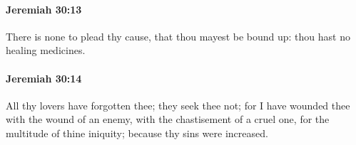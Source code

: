 		\paragraph{Jeremiah 30:13} %
			\label{JEREMIAH-30-13}

			There is none to plead thy cause, that thou mayest be bound up: thou hast no healing medicines.


		\paragraph{Jeremiah 30:14} %
			\label{JEREMIAH-30-14}

			All thy lovers have forgotten thee; they seek thee not; for I have wounded thee with the wound of an enemy, with the chastisement of a cruel one, for the multitude of thine iniquity; because thy sins were increased.



